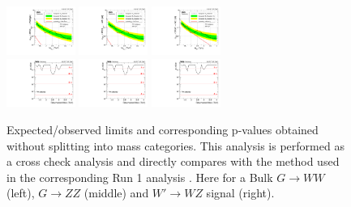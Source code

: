 \begin{figure}[h!]
\centering
\includegraphics[width=0.20\textwidth]{figures/analysis/search1/AN-15-211/limits/brazilianFlag_BulkWW_old_combined_13TeV_wPDF.pdf}
\includegraphics[width=0.20\textwidth]{figures/analysis/search1/AN-15-211/limits/brazilianFlag_BulkZZ_old_combined_13TeV_wPDF.pdf}
\includegraphics[width=0.20\textwidth]{figures/analysis/search1/AN-15-211/limits/brazilianFlag_WZ_old_combined_13TeV_wPDF.pdf}\\
\includegraphics[width=0.20\textwidth]{figures/analysis/search1/AN-15-211/pvalues/pvalue_BulkWWin_combined_old.pdf}
\includegraphics[width=0.20\textwidth]{figures/analysis/search1/AN-15-211/pvalues/pvalue_BulkZZin_combined_old.pdf}
\includegraphics[width=0.20\textwidth]{figures/analysis/search1/AN-15-211/pvalues/pvalue_WZin_combined_old.pdf}

\caption{Expected/observed limits and corresponding p-values obtained without splitting into mass categories. This analysis is performed as a cross check analysis and directly compares with the method used in the corresponding Run 1 analysis \cite{CMS-PAS-EXO-14-024}.  Here for a Bulk $G\rightarrow WW$ (left), $G\rightarrow ZZ$ (middle) and $W'\rightarrow WZ$ signal (right).}
\label{fig:app:Limits_CombOld}
\end{figure}
\clearpage

